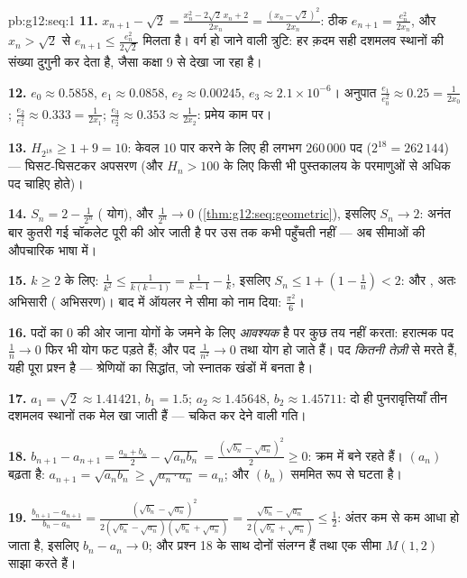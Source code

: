 \begin{solution}{pb:g12:seq:1}
\textbf{11.} $x_{n+1} - \sqrt2 = \frac{x_n^2 - 2\sqrt2\,x_n +
2}{2x_n} = \frac{(x_n - \sqrt2)^2}{2x_n}$: ठीक $e_{n+1} = \frac{e_n^2}{2x_n}$, और $x_n > \sqrt2$ से $e_{n+1} \leq \frac{e_n^2}{2\sqrt2}$ मिलता है। वर्ग हो जाने वाली
त्रुटि: हर क़दम सही दशमलव स्थानों की संख्या दुगुनी कर देता है, जैसा कक्षा 9
से देखा जा रहा है।

\textbf{12.} $e_0 \approx 0.5858$, $e_1 \approx 0.0858$, $e_2 \approx 0.00245$, $e_3 \approx 2.1 \times 10^{-6}$। अनुपात $\frac{e_1}{e_0^2} \approx 0.25 = \frac{1}{2x_0}$; $\frac{e_2}{e_1^2} \approx 0.333 = \frac{1}{2x_1}$; $\frac{e_3}{e_2^2} \approx 0.353 \approx \frac{1}{2x_2}$: प्रमेय
काम पर।

\textbf{13.} $H_{2^{18}} \geq 1 + 9 = 10$: केवल $10$ पार करने के लिए ही लगभग $260\,000$ पद ($2^{18} = 262\,144$) ---
घिसट-घिसटकर अपसरण (और $H_n > 100$ के लिए किसी भी पुस्तकालय के परमाणुओं से अधिक पद
चाहिए होते)।

\textbf{14.} $S_n = 2 - \frac{1}{2^n}$ ( योग), और $\frac{1}{2^n} \to 0$ (\cref{thm:g12:seq:geometric}), इसलिए $S_n \to 2$: अनंत बार
कुतरी गई चॉकलेट पूरी की ओर जाती है पर उस तक कभी पहुँचती नहीं --- अब सीमाओं की
औपचारिक भाषा में।

\textbf{15.} $k \geq 2$ के लिए: $\frac{1}{k^2} \leq \frac{1}{k(k-1)} = \frac{1}{k-1} -
\frac1k$, इसलिए $S_n \leq 1 + \left(1 - \frac1n\right) < 2$:  और , अतः
अभिसारी ( अभिसरण)। बाद में ऑयलर ने सीमा को नाम दिया: $\frac{\pi^2}{6}$।

\textbf{16.} पदों का $0$ की ओर जाना योगों के जमने के लिए \emph{आवश्यक} है
पर कुछ तय नहीं करता: हरात्मक पद $\frac1n \to 0$ फिर भी योग फट पड़ते हैं; और पद $\frac{1}{n^2} \to 0$
तथा योग  हो जाते हैं। पद \emph{कितनी तेज़ी} से मरते हैं, यही पूरा
प्रश्न है --- श्रेणियों का सिद्धांत, जो स्नातक खंडों में बनता है।

\textbf{17.} $a_1 = \sqrt2 \approx 1.41421$, $b_1 = 1.5$; $a_2 \approx 1.45648$, $b_2 \approx 1.45711$: दो ही पुनरावृत्तियाँ तीन दशमलव
स्थानों तक मेल खा जाती हैं --- चकित कर देने वाली गति।

\textbf{18.} $b_{n+1} - a_{n+1} = \frac{a_n + b_n}{2} -
\sqrt{a_n b_n} = \frac{(\sqrt{b_n} - \sqrt{a_n})^2}{2} \geq
0$:  क्रम में बने रहते हैं। $(a_n)$ बढ़ता है: $a_{n+1} = \sqrt{a_n b_n} \geq \sqrt{a_n \cdot a_n} = a_n$; और
$(b_n)$ सममित रूप से घटता है।

\textbf{19.} $\frac{b_{n+1} - a_{n+1}}{b_n - a_n} =
\frac{(\sqrt{b_n} - \sqrt{a_n})^2}
{2(\sqrt{b_n} - \sqrt{a_n})(\sqrt{b_n} + \sqrt{a_n})}
= \frac{\sqrt{b_n} - \sqrt{a_n}}{2(\sqrt{b_n} + \sqrt{a_n})}
\leq \frac12$: अंतर कम से कम आधा हो जाता है, इसलिए $b_n - a_n \to 0$; और प्रश्न 18
के साथ दोनों  संलग्न हैं तथा एक सीमा $M(1, 2)$ साझा करते हैं।


\end{solution}

